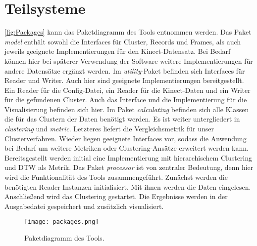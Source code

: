 \section{Teilsysteme}
\label{4-Teilsysteme}
\autoref{fig:Packages} kann das Paketdiagramm des Tools entnommen werden.
Das Paket \emph{model} enthält sowohl die Interfaces für Cluster, Records und Frames,
als auch jeweils geeignete Implementierungen für den Kinect-Datensatz.
Bei Bedarf können hier bei späterer Verwendung der Software weitere Implementierungen
für andere Datensätze ergänzt werden.
Im \emph{utility}-Paket befinden sich Interfaces für Reader und Writer.
Auch hier sind geeignete Implementierungen bereitgestellt.
Ein Reader für die Config-Datei, ein Reader für die Kinect-Daten
und ein Writer für die gefundenen Cluster.
Auch das Interface und die Implementierung für die Visualisierung befinden sich hier.
Im Paket \emph{calculating} befinden sich alle Klassen die für das Clustern der Daten benötigt werden.
Es ist weiter untergliedert in \emph{clustering} und \emph{metric}.
Letzteres liefert die Vergleichsmetrik für unser Clusterverfahren.
Wieder liegen geeignete Interfaces vor,
sodass die Anwendung bei Bedarf um weitere Metriken oder Clustering-Ansätze erweitert werden kann.
Bereitsgestellt werden initial eine Implementierung mit hierarchischem Clustering
und \ac{DTW} als Metrik.
Das Paket \emph{processor} ist von zentraler Bedeutung,
denn hier wird die Funktionalität des Tools zusammengeführt.
Zunächst werden die benötigten Reader Instanzen initialisiert.
Mit ihnen werden die Daten eingelesen.
Anschließend wird das Clustering gestartet.
Die Ergebnisse werden in der Ausgabedatei gespeichert und zusätzlich visualisiert.
\begin{figure}[ht]
    \begin{center}
    \texttt{[image: packages.png]}
    \end{center}
    \caption{Paketdiagramm des Tools.}
    \label{fig:Packages}
\end{figure}

\clearpage

